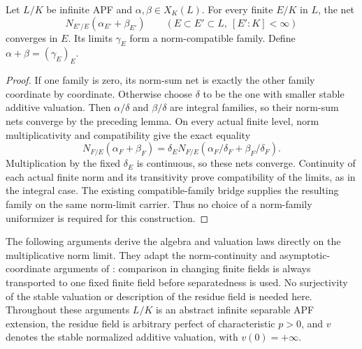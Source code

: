 \begin{theorem}
\label{fw:addition-limit}
\leanok
Let $L/K$ be infinite APF and $\alpha,\beta\in X_K(L)$.
For every finite $E/K$ in $L$, the net
\[
 N_{E'/E}(\alpha_{E'}+\beta_{E'})
 \qquad(E\subset E'\subset L,\ [E':K]<\infty)
\]
converges in $E$. Its limits $\gamma_E$ form a norm-compatible family.
Define $\alpha+\beta=(\gamma_E)_E$.
\end{theorem}
\begin{proof}
If one family is zero, its norm-sum net is exactly the other
family coordinate by coordinate. Otherwise choose $\delta$ to be
the one with smaller stable additive valuation. Then
$\alpha/\delta$ and $\beta/\delta$ are integral families, so their
norm-sum nets converge by the preceding lemma.
On every actual finite level, norm multiplicativity and compatibility
give the exact equality
\[
 N_{F/E}(\alpha_F+\beta_F)
 =\delta_E N_{F/E}(\alpha_F/\delta_F+\beta_F/\delta_F).
\]
Multiplication by the fixed $\delta_E$ is continuous, so these
nets converge. Continuity of each actual finite norm and its
transitivity prove compatibility of the limits, as in the integral
case. The existing compatible-family bridge supplies the resulting
family on the same norm-limit carrier. Thus no choice of a norm-family
uniformizer is required for this construction.
\end{proof}


\begin{remark}
The following arguments derive the algebra and valuation laws directly
on the multiplicative norm limit. They adapt the norm-continuity and
asymptotic-coordinate arguments of \cite[Sections 2.2--2.3]{Wintenberger1983}:
comparison in changing finite fields is always transported to one fixed
finite field before separatedness is used. No surjectivity of the stable
valuation or description of the residue field is needed here.
Throughout these arguments $L/K$ is an abstract infinite separable APF
extension, the residue field is arbitrary perfect of characteristic
$p>0$, and $v$ denotes the stable normalized additive valuation, with
$v(0)=+\infty$.
\end{remark}

